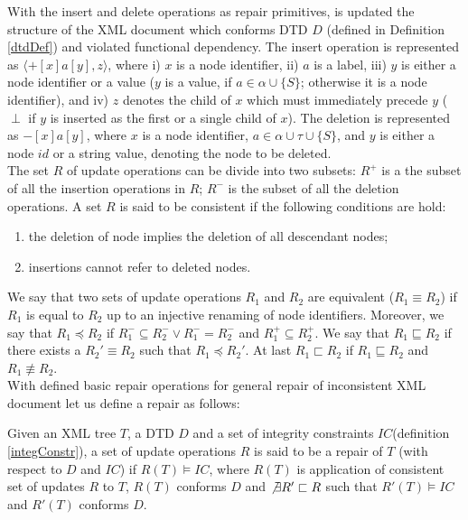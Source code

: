 With the insert and delete operations as repair primitives, is updated the structure of the XML document which conforms DTD $D$ (defined in Definition \ref{dtdDef}) and violated functional dependency. The insert operation is represented as $\langle  + [x]a[y], z\rangle$, where i) $x$ is a node identifier, ii) $a$ is a label, iii) $y$ is either a node identifier or a value ($y$ is a value, if $a \in \alpha \cup \{S\}$; otherwise it is a node identifier), and iv) $z$ denotes the child of $x$ which must immediately precede $y$ ($\perp$ if $y$ is inserted as the first or a single child of $x$). The deletion is represented as $-[x]a[y]$, where $x$ is a node identifier, $a \in \alpha \cup \tau \cup \{S\}$, and $y$ is either a node $id$ or a string value, denoting the node to be deleted.\\
The set $R$ of update operations can be divide into two subsets: $R^+$ is a the subset of all the insertion operations in $R$; $R^-$ is the subset of all the deletion operations. A set $R$ is said to be consistent if the following conditions are hold:
\begin{enumerate}
	\item the deletion of node implies the deletion of all descendant nodes;
    \item insertions cannot refer to deleted nodes.
\end{enumerate}
We say that two sets of update operations $R_1$ and $R_2$ are equivalent ($R_1 \equiv R_2$) if $R_1$ is equal to $R_2$ up to an injective renaming of node identifiers. Moreover, we say that $R_1 \preceq R_2$ if $R_1^- \subseteq R_2^- \lor R_1^- = R_2^-$ and $R_1^+ \subseteq R_2^+$. We say that $R_1 \sqsubseteq R_2$ if there exists a $R_2' \equiv R_2$ such that  $R_1 \preceq R_2'$. At last $R_1 \sqsubset R_2$ if $R_1 \sqsubseteq R_2$ and $R_1 \not \equiv R_2$.\\

With defined basic repair operations for general repair of inconsistent XML document let us define a repair as follows:

\begin{define}[Repair]
Given an XML tree $T$, a DTD $D$ and a set of integrity constraints $IC$(definition \ref{integConstr}), a set of update operations $R$ is said to be a repair of $T$ (with respect to $D$ and $IC$) if $R(T) \models IC$, where $R(T)$ is application of consistent set of updates $R$ to $T$, $R(T)$ conforms $D$ and $\not \exists R' \sqsubset R$ such that $R'(T) \models IC$ and $R'(T)$ conforms $D$.
\end{define}

